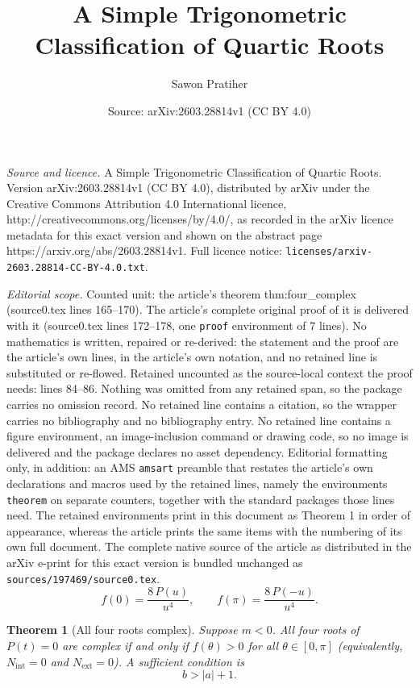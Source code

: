 \documentclass[10pt,a4paper]{amsart}
\title{A Simple Trigonometric Classification of Quartic Roots}
\author{Sawon Pratiher}
\date{Source: arXiv:2603.28814v1 (CC BY 4.0)}
\newtheorem{theorem}{Theorem}
\begin{document}
\maketitle

\noindent\emph{Source and licence.} A Simple Trigonometric Classification of Quartic Roots. Version arXiv:2603.28814v1 (CC BY 4.0), distributed by arXiv under the Creative Commons Attribution 4.0 International licence, http://creativecommons.org/licenses/by/4.0/, as recorded in the arXiv licence metadata for this exact version and shown on the abstract page https://arxiv.org/abs/2603.28814v1. Full licence notice: \texttt{licenses/arxiv-2603.28814-CC-BY-4.0.txt}.\par\smallskip

\noindent\textit{Editorial scope.} Counted unit: the article's theorem thm:four\_complex (source0.tex lines 165--170). The article's complete original proof of it is delivered with it (source0.tex lines 172--178, one \texttt{proof} environment of 7 lines). No mathematics is written, repaired or re-derived: the statement and the proof are the article's own lines, in the article's own notation, and no retained line is substituted or re-flowed.  Retained uncounted as the source-local context the proof needs: lines 84--86.  Nothing was omitted from any retained span, so the package carries no omission record.  No retained line contains a citation, so the wrapper carries no bibliography and no bibliography entry.  No retained line contains a figure environment, an image-inclusion command or drawing code, so no image is delivered and the package declares no asset dependency.  Editorial formatting only, in addition: an AMS \texttt{amsart} preamble that restates the article's own declarations and macros used by the retained lines, namely the environments \texttt{theorem} on separate counters, together with the standard packages those lines need.  The retained environments print in this document as Theorem 1 in order of appearance, whereas the article prints the same items with the numbering of its own full document.  The complete native source of the article as distributed in the arXiv e-print for this exact version is bundled unchanged as \texttt{sources/197469/source0.tex}.
\begin{equation}\label{eq:boundary}
f(0) = \frac{8\,P(u)}{u^4}, \qquad f(\pi) = \frac{8\,P(-u)}{u^4}.
\end{equation}

\begin{theorem}[All four roots complex]\label{thm:four_complex}
Suppose $m < 0$. All four roots of $P(t) = 0$ are complex if and only if $f(\theta) > 0$ for all $\theta \in [0,\pi]$ (equivalently, $N_{\mathrm{int}} = 0$ and $N_{\mathrm{ext}} = 0$). A sufficient condition is
\begin{equation}\label{eq:four_complex_suff}
b > |a| + 1.
\end{equation}
\end{theorem}
\end{document}

